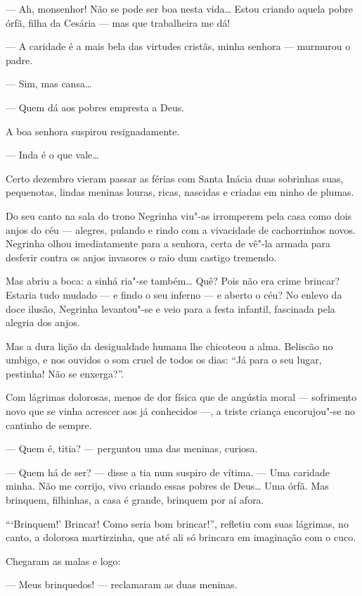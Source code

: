 --- Ah, monsenhor! Não se pode ser boa nesta vida\ldots{} Estou criando
aquela pobre órfã, filha da Cesária --- mas que trabalheira me dá!

--- A caridade é a mais bela das virtudes cristãs, minha senhora ---
murmurou o padre.

--- Sim, mas cansa\ldots{}

--- Quem dá aos pobres empresta a Deus.

A boa senhora suspirou resignadamente.

--- Inda é o que vale\ldots{}

Certo dezembro vieram passar as férias com Santa Inácia duas sobrinhas
suas, pequenotas, lindas meninas louras, ricas, nascidas e criadas em
ninho de plumas.

Do seu canto na sala do trono Negrinha viu"-as irromperem pela casa como
dois anjos do céu --- alegres, pulando e rindo com a vivacidade de
cachorrinhos novos. Negrinha olhou imediatamente para a senhora, certa
de vê"-la armada para desferir contra os anjos invasores o raio dum
castigo tremendo.

Mas abriu a boca: a sinhá ria"-se também\ldots{} Quê? Pois não era crime
brincar? Estaria tudo mudado --- e findo o seu inferno --- e aberto o
céu? No enlevo da doce ilusão, Negrinha levantou"-se e veio para a festa
infantil, fascinada pela alegria dos anjos.

Mas a dura lição da desigualdade humana lhe chicoteou a alma. Beliscão
no umbigo, e nos ouvidos o som cruel de todos os dias: ``Já para o seu
lugar, pestinha! Não se enxerga?''.

Com lágrimas dolorosas, menos de dor física que de angústia moral ---
sofrimento novo que se vinha acrescer aos já conhecidos ---, a triste
criança encorujou"-se no cantinho de sempre.

--- Quem é, titia? --- perguntou uma das meninas, curiosa.

--- Quem há de ser? --- disse a tia num suspiro de vítima. --- Uma
caridade minha. Não me corrijo, vivo criando essas pobres de Deus\ldots{} Uma
órfã. Mas brinquem, filhinhas, a casa é grande, brinquem por aí afora.

```Brinquem!' Brincar! Como seria bom brincar!'', refletiu com suas
lágrimas, no canto, a dolorosa martirzinha, que até ali só brincara em
imaginação com o cuco.

Chegaram as malas e logo:

--- Meus brinquedos! --- reclamaram as duas meninas.

